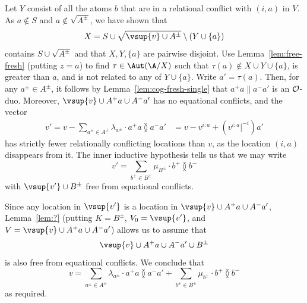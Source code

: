 \begin{claimproof}
Let $Y$ consist of all the atoms $b$ that are in a relational conflict with $(i,a)$ in $V$. 
As $a \not\in S$ and $a \not\in \sqrt{A^\pm}$, we have shown that
\[
    X = S \cup \sqrt{\vsup{v} \cup A^\pm} \setminus (Y \cup \{a\})   
\]
contains $S \cup \sqrt{A^\pm}$ and that $X, Y, \{a\}$ are pairwise disjoint.
Use Lemma~\ref{lem:free-fresh} (putting $z=a$) to find $\tau \in \Aut(\A/X)$ such that $\tau(a) \not\in X \cup Y \cup \{a\}$, is greater than $a$, and is not related to any of $Y \cup \{a\}$. 
Write $a'=\tau(a)$.
Then, for any $a^\pm \in A^\pm$, it follows by Lemma~\ref{lem:cog-fresh-single} that $a^+ a \parallel a^- a'$ is an $\cal O$-duo. 
Moreover, $\vsup{v} \cup A^+ a \cup A^- a'$ has no equational conflicts, and the vector
\begin{align*}
    v' = v - \sum_{a^\pm\in A^\pm} \lambda_{a^\pm} \cdot a^+ a \between a^- a'
    &= v - v^{i:a} + (v^{i:a}|^{-i}) a' 
\end{align*}
has strictly fewer relationally conflicting locations than $v$, as the location $(i,a)$ disappears from it.
The inner inductive hypothesis tells us that we may write
\[
    v' = \sum_{b^\pm\in B^\pm} \mu_{B^\pm} \cdot b^+ \between b^-
\]
with $\vsup{v'} \cup B^\pm$ free from equational conflicts.

Since any location in $\vsup{v'}$ is a location in $\vsup{v} \cup A^+ a \cup A^- a'$, Lemma~\ref{lem:?} (putting $K = B^\pm$, $V_0 = \vsup{v'}$, and $V = \vsup{v} \cup A^+a \cup A^- a'$) allows us to assume that 
\[
    \vsup{v} \cup A^+ a \cup A^-a' \cup B^\pm
\]
is also free from equational conflicts. We conclude that 
\[
    v =\sum_{a^\pm\in A^\pm} \lambda_{a^\pm} \cdot a^+ a \between a^-a'+ \sum_{b^\pm\in B^\pm} \mu_{b^\pm} \cdot b^+ \between b^-
\]
as required.
\end{claimproof}

